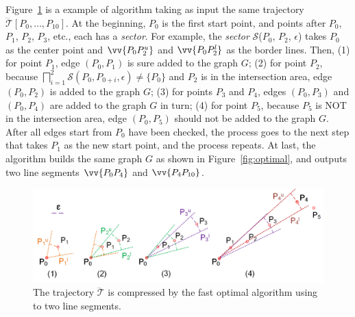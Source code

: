 {\begin{example}
	\label{exm-alg-optped}
	Figure~\ref{fig:optped} is a example of algorithm {\optp} taking as input the same trajectory $\dddot{\mathcal{T}}[P_0, \ldots, P_{10}]$. At the beginning, $P_0$ is the first start point, and points after $P_0$, \ie $P_1$, $P_2$, $P_3$, etc., each has a \emph{sector}. For example, the \emph{sector} $\mathcal{S}$($P_0$, $P_{2}$, $\epsilon$) takes $P_0$ as the center point and $\vv{P_0P^u_{2}}$ and $\vv{P_0P^l_{2}}$ as the border lines.
	Then, (1) for point $P_1$, edge $(P_0, P_1)$ is sure added to the graph $G$;
	(2) for point $P_2$, because $\bigsqcap_{i=1}^{2}\mathcal{S}(P_0, P_{0+i}, \epsilon) \ne \{P_0\}$ and $P_2$ is in the intersection area, edge $(P_0, P_2)$ is added to the graph $G$;
	(3) for points $P_3$ and $P_4$, edges $(P_0, P_3)$ and $(P_0, P_4)$ are added to the graph $G$ in turn;
	(4) for point $P_5$, because $P_5$ is NOT in the intersection area, edge $(P_0, P_5)$ should not be added to the graph $G$.
	After all edges start from $P_0$ have been checked, the process goes to the next step that takes $P_1$ as the new start point, and the process repeats.
	At last, the algorithm builds the same graph $G$ as shown in Figure~\ref{fig:optimal}, and outputs two line segments $\vv{P_0P_4}$ and $\vv{P_4P_{10}}$.
\end{example}

\begin{figure}[tb!]
	\centering
	\hspace{-1ex}\includegraphics[scale=0.66]{Figures/Fig-OptPed.png}\vspace{-3ex}
	\caption{\small The trajectory $\dddot{\mathcal{T}}$ is compressed by the fast optimal algorithm using \ped to two line segments.}	\vspace{-3ex}
	\label{fig:optped}
\end{figure}

}

